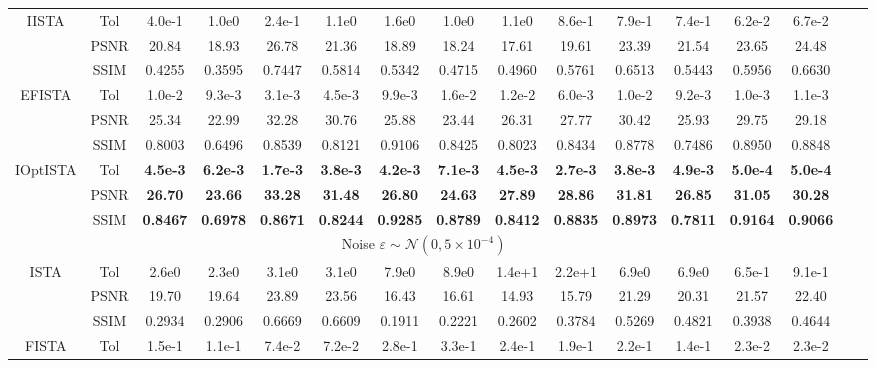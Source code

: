 \documentclass{article}
\begin{document}
\begin{table*}[thp]
\begin{center}
\begin{tabular}{c|c|c c | cc | cc| cc| cc| cc cc }
\multirow{3}{*}{IISTA} & Tol & 4.0e-1 &1.0e0 & 2.4e-1& 1.1e0  & 1.6e0 & 1.0e0 & 1.1e0 & 8.6e-1 & 7.9e-1 & 7.4e-1 & 6.2e-2 & 6.7e-2  \\
	  & PSNR & 20.84 &18.93 & 26.78 & 21.36  & 18.89 & 18.24 & 17.61 & 19.61 & 23.39 & 21.54 & 23.65 & 24.48\\ 
      & SSIM & 0.4255 &0.3595 & 0.7447 & 0.5814  & 0.5342 & 0.4715 & 0.4960 & 0.5761 & 0.6513 & 0.5443 & 0.5956 & 0.6630  \\\hline
\multirow{3}{*}{EFISTA} & Tol & 1.0e-2 &9.3e-3 & 3.1e-3 & 4.5e-3  & 9.9e-3 & 1.6e-2 & 1.2e-2 & 6.0e-3 & 1.0e-2 & 9.2e-3 & 1.0e-3 & 1.1e-3   \\
	  & PSNR & 25.34 & 22.99 & 32.28 & 30.76  & 25.88 & 23.44 & 26.31 & 27.77 & 30.42 & 25.93 & 29.75 & 29.18\\ 
      & SSIM & 0.8003 & 0.6496 & 0.8539 & 0.8121  & 0.9106 & 0.8425 & 0.8023 & 0.8434 & 0.8778 & 0.7486 & 0.8950 & 0.8848  \\\hline
\multirow{3}{*}{IOptISTA} & Tol & \textbf{4.5e-3} & \textbf{6.2e-3} & \textbf{1.7e-3} & \textbf{3.8e-3}  & \textbf{4.2e-3} & \textbf{7.1e-3} &\textbf{4.5e-3} & \textbf{2.7e-3} & \textbf{3.8e-3} & \textbf{4.9e-3} &\textbf{5.0e-4} & \textbf{5.0e-4}  \\
	  & PSNR & \textbf{26.70} & \textbf{23.66} &  \textbf{33.28} & \textbf{31.48}  & \textbf{26.80} & \textbf{24.63} &\textbf{27.89} & \textbf{28.86} & \textbf{31.81} & \textbf{26.85} &\textbf{31.05} & \textbf{30.28}\\ 
      & SSIM & \textbf{0.8467} &\textbf{0.6978} & \textbf{0.8671} & \textbf{0.8244}  & \textbf{0.9285} & \textbf{0.8789} &\textbf{0.8412} & \textbf{0.8835} & \textbf{0.8973} & \textbf{0.7811} &\textbf{0.9164} & \textbf{0.9066} \\\hline
\multicolumn{14}{c}{Noise $\varepsilon\sim \mathcal{N}(0,5\times 10^{-4})$} \\\hline
\multirow{3}{*}{ISTA} & Tol & 2.6e0 & 2.3e0 & 3.1e0 & 3.1e0  & 7.9e0 & 8.9e0 & 1.4e+1 & 2.2e+1 & 6.9e0 & 6.9e0 & 6.5e-1 & 9.1e-1   \\
	  & PSNR & 19.70 &  19.64 & 23.89 & 23.56  & 16.43 & 16.61 & 14.93 & 15.79 & 21.29 & 20.31 & 21.57 & 22.40 \\ 
      & SSIM & 0.2934 & 0.2906 & 0.6669 & 0.6609  & 0.1911 & 0.2221 & 0.2602 & 0.3784 & 0.5269 & 0.4821 & 0.3938 & 0.4644  \\\hline
\multirow{3}{*}{FISTA} & Tol & 1.5e-1 & 1.1e-1 & 7.4e-2 & 7.2e-2  & 2.8e-1 & 3.3e-1 & 2.4e-1 & 1.9e-1 & 2.2e-1 & 1.4e-1 & 2.3e-2 & 2.3e-2   \\

\end{tabular}
\end{center}
\end{table*}
\end{document}
